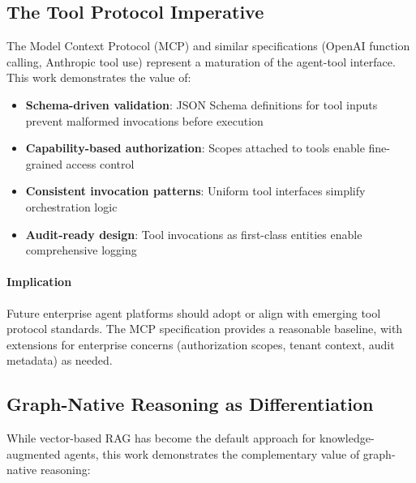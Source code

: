 \subsection{The Tool Protocol Imperative}

The Model Context Protocol (MCP) and similar specifications (OpenAI function calling, Anthropic tool use) represent a maturation of the agent-tool interface. This work demonstrates the value of:

\begin{itemize}
    \item \textbf{Schema-driven validation}: JSON Schema definitions for tool inputs prevent malformed invocations before execution
    \item \textbf{Capability-based authorization}: Scopes attached to tools enable fine-grained access control
    \item \textbf{Consistent invocation patterns}: Uniform tool interfaces simplify orchestration logic
    \item \textbf{Audit-ready design}: Tool invocations as first-class entities enable comprehensive logging
\end{itemize}

\paragraph{Implication}
Future enterprise agent platforms should adopt or align with emerging tool protocol standards. The MCP specification provides a reasonable baseline, with extensions for enterprise concerns (authorization scopes, tenant context, audit metadata) as needed.

\subsection{Graph-Native Reasoning as Differentiation}

While vector-based RAG has become the default approach for knowledge-augmented agents, this work demonstrates the complementary value of graph-native reasoning:

